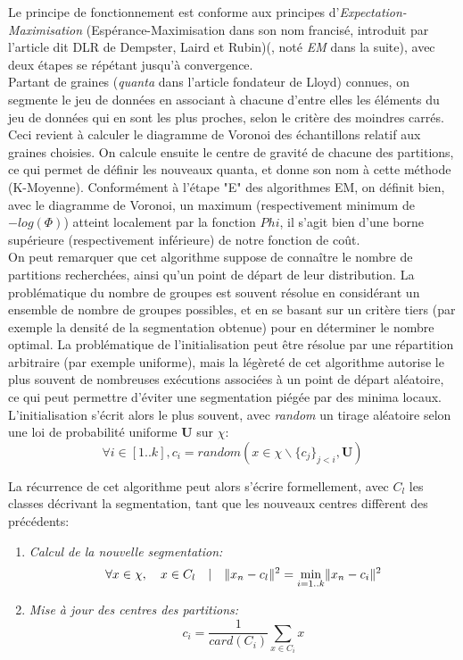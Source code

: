 Le principe de fonctionnement est conforme aux principes d'\emph{Expectation-Maximisation} (Espérance-Maximisation dans son nom francisé, introduit par l'article dit \og DLR\fg{} de Dempster, Laird et Rubin)(\cite{Dempster1977, McLachlan1997}, noté \emph{EM} dans la suite), avec deux étapes se répétant jusqu'à convergence.\\
Partant de \og graines\fg{} (\emph{quanta} dans l'article fondateur de Lloyd) connues, on segmente le jeu de données en associant à chacune d'entre elles les éléments du jeu de données qui en sont les plus proches, selon le critère des moindres carrés. Ceci revient à calculer le diagramme de Voronoi des échantillons relatif aux graines choisies. On calcule ensuite le centre de gravité de chacune des partitions, ce qui permet de définir les nouveaux quanta, et donne son nom à cette méthode (K-Moyenne). Conformément à l'étape "E" des algorithmes EM, on définit bien, avec le diagramme de Voronoi, un maximum  (respectivement minimum de $-log(\Phi)$) atteint localement par la fonction $Phi$, il s'agit bien d'une borne supérieure (respectivement inférieure) de notre fonction de coût.\\

On peut remarquer que cet algorithme suppose de connaître le nombre de partitions recherchées, ainsi qu'un point de départ de leur distribution. La problématique du nombre de groupes est souvent résolue en considérant un ensemble de nombre de groupes possibles, et en se basant sur un critère tiers (par exemple la densité de la segmentation obtenue) pour en déterminer le nombre optimal. La problématique de l'initialisation peut être résolue par une répartition arbitraire (par exemple uniforme), mais la légèreté de cet algorithme autorise le plus souvent de nombreuses exécutions associées à un point de départ aléatoire, ce qui peut permettre d'éviter une segmentation piégée par des minima locaux. L'initialisation s'écrit alors le plus souvent, avec \emph{random} un tirage aléatoire selon une loi de probabilité uniforme $\mathbf{U}$ sur $\chi$:\\
\begin{equation}
	\forall i \in [1..k], c_i = random( x \in \chi \backslash \{ c_j \}_{j<i}, \mathbf{U})
\end{equation}

La récurrence de cet algorithme peut alors s'écrire formellement, avec $C_l$ les classes décrivant la segmentation, tant que les nouveaux centres diffèrent des précédents:
\begin{enumerate}
	\item{\emph{Calcul de la nouvelle segmentation:}}
	\begin{equation}
		\forall x \in \chi, \quad x \in C_l \quad \arrowvert \quad  \lVert x_n - c_l \rVert^2 = \min_{i=1..k} \lVert x_n - c_i \rVert^2 
	\end{equation}
	
	\item\emph{{Mise à jour des centres des partitions:}}
	\begin{equation} \label{eq:ch5_kmeans_recurrence}
		c_i = \frac{1}{card(C_i)} \sum\limits_{x \in C_i} x
	\end{equation}
\end{enumerate}

